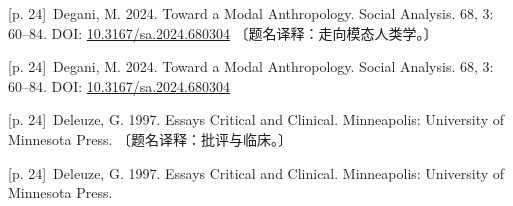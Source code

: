 \documentclass[10pt,a4paper]{article}
\begin{document}
\noindent\begin{minipage}{\textwidth}\begin{minipage}[t]{\dimexpr.5\textwidth-4mm\relax}\noindent\begin{minipage}[t]{\linewidth}{\scriptsize\color{gray} [p. 24]}\ Degani, M. 2024. Toward a Modal Anthropology. Social Analysis. 68, 3: 60–84. DOI: \url{10.3167/sa.2024.680304} 〔题名译释：走向模态人类学。〕\par\end{minipage}\par\end{minipage}\hfill\begin{minipage}[t]{\dimexpr.5\textwidth-4mm\relax}\noindent\begin{minipage}[t]{\linewidth}{\scriptsize\color{gray} [p. 24]}\ Degani, M. 2024. Toward a Modal Anthropology. Social Analysis. 68, 3: 60–84. DOI: \url{10.3167/sa.2024.680304}\par\end{minipage}\par\end{minipage}\end{minipage}\par
\noindent\begin{minipage}{\textwidth}\begin{minipage}[t]{\dimexpr.5\textwidth-4mm\relax}\noindent\begin{minipage}[t]{\linewidth}{\scriptsize\color{gray} [p. 24]}\ Deleuze, G. 1997. Essays Critical and Clinical. Minneapolis: University of Minnesota Press. 〔题名译释：批评与临床。〕\par\end{minipage}\par\end{minipage}\hfill\begin{minipage}[t]{\dimexpr.5\textwidth-4mm\relax}\noindent\begin{minipage}[t]{\linewidth}{\scriptsize\color{gray} [p. 24]}\ Deleuze, G. 1997. Essays Critical and Clinical. Minneapolis: University of Minnesota Press.\par\end{minipage}\par\end{minipage}\end{minipage}\par
\end{document}
